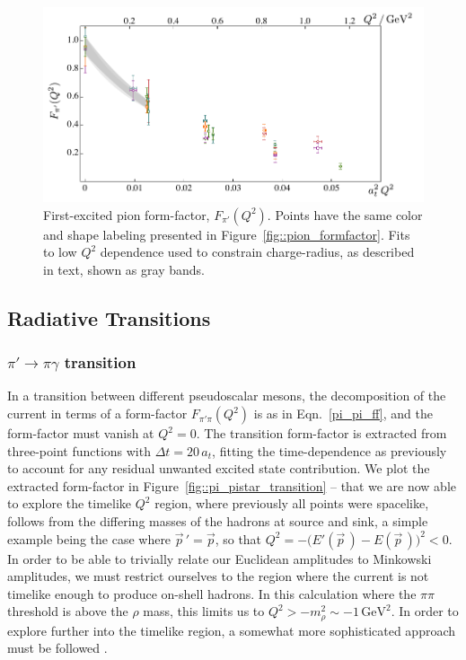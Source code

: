 \documentclass[twocolumn,amsmath,amssymb,prd,10pt,floatfix, 
superscriptaddress,nofootinbib, showpacs, preprintnumbers]{revtex4-1}
\begin{document}
\begin{figure}[h]
  \includegraphics[width=1.07\linewidth]{fig16.pdf}
  \caption{First-excited pion form-factor, $F_{\pi'}(Q^2)$. Points have the same color and shape labeling presented in Figure~\ref{fig::pion_formfactor}. Fits to low $Q^2$ dependence used to constrain charge-radius, as described in text, shown as gray bands.  
  \label{fig::piStar_form_factor}}
\end{figure}


\subsection{Radiative Transitions}


\subsubsection{$\pi' \rightarrow \pi \gamma$ transition}


In a transition between different pseudoscalar mesons, the decomposition of the current in terms of a form-factor $F_{\pi' \pi}(Q^2)$ is as in Eqn.~\ref{pi_pi_ff}, and the form-factor must vanish at $Q^2=0$. The transition form-factor is extracted from three-point functions with $\Delta t = 20 \, a_t$, fitting the time-dependence as previously to account for any residual unwanted excited state contribution. We plot the extracted form-factor in Figure~\ref{fig::pi_pistar_transition} -- that we are now able to explore the timelike $Q^2$ region, where previously all points were spacelike, follows from the differing masses of the hadrons at source and sink, a simple example being the case where $\vec{p}\,' = \vec{p}$, so that ${Q^2 = - \big( E'(\vec{p}\,) - E(\vec{p}\,) \big)^2 < 0}$. In order to be able to trivially relate our Euclidean amplitudes to Minkowski amplitudes, we must restrict ourselves to the region where the current is not timelike enough to produce on-shell hadrons. In this calculation where the $\pi \pi$ threshold is above the $\rho$ mass, this limits us to ${  Q^2 > - m_\rho^2 \sim - 1\,\mathrm{GeV}^2  }$. In order to explore further into the timelike region, a somewhat more sophisticated approach must be followed \cite{Meyer:2011um, Feng:2014gba}.
\end{document}
